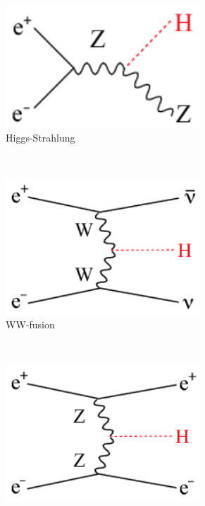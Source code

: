    \begin{figure}  
        \centering
        \begin{subfigure}[t]{0.3\textwidth}
            \includegraphics[width = 0.8\textwidth]{Pictures/Higgs/Chapter_Theory_figs_ZHdiagram.png}
            \caption{Higgs-Strahlung}
            \label{fig:higgsStrahlung}
        \end{subfigure}
        ~%
        \begin{subfigure}[t]{0.3\textwidth}
            \includegraphics[width = 0.8\textwidth]{Pictures/Higgs/Chapter_Theory_figs_nunuHdiagram.png}
            \caption{WW-fusion}
            \label{fig:WW-fusion}
        \end{subfigure}
        ~%
        \begin{subfigure}[t]{0.3\textwidth}
            \includegraphics[width = 0.8\textwidth]{Pictures/Higgs/HiggsProd_eeH.png}

\end{subfigure}
\end{figure}
